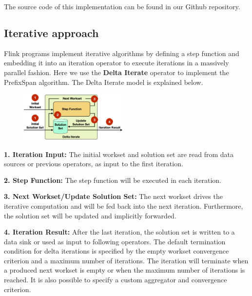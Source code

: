 \documentclass[a4paper,10pt,twocolumn]{article}
\begin{document}
The source code of this implementation can be found in our Github repository. \cite{GithubRecursive}

\subsection{Iterative approach}
Flink programs implement iterative algorithms by defining a step function and embedding it into an iteration operator to execute iterations in a massively parallel fashion. Here we use the \textbf{Delta Iterate} operator to implement the PrefixSpan algorithm. The Delta Iterate model is explained below.

\begin{figure}[h]
\includegraphics[width=0.48\textwidth]{iterations_delta_iterate_operator}
\end{figure}

\textbf{1. Iteration Input:} The initial workset and solution set are read from data sources or previous operators, as input to the first iteration. 

\textbf{2. Step Function:} The step function will be executed in each iteration.

\textbf{3. Next Workset/Update Solution Set:} The next workset drives the iterative computation and will be fed back into the next iteration. Furthermore, the solution set will be updated and implicitly forwarded.

\textbf{4. Iteration Result:} After the last iteration, the solution set is written to a data sink or used as input to following operators. The default termination condition for delta iterations is specified by the empty workset convergence criterion and a maximum number of iterations. The iteration will terminate when a produced next workset is empty or when the maximum number of iterations is reached. It is also possible to specify a custom aggregator and convergence criterion.
\end{document}

